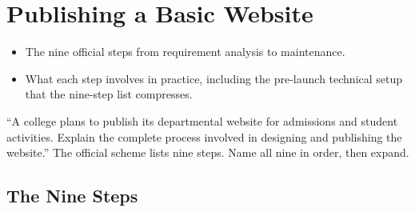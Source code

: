 \documentclass{MMTextbook}
\begin{document}
\chapter{Publishing a Basic Website}


\begin{learningoutcomes}
\begin{itemize}
\item The nine official steps from requirement analysis to maintenance.
\item What each step involves in practice, including the pre-launch technical
      setup that the nine-step list compresses.
\end{itemize}
\end{learningoutcomes}

\begin{keybox}
``A college plans to publish its departmental website for admissions and student
activities. Explain the complete process involved in designing and publishing the
website.''
The official scheme lists nine steps. Name all nine in order, then expand.
\end{keybox}

\section{The Nine Steps}
\end{document}
